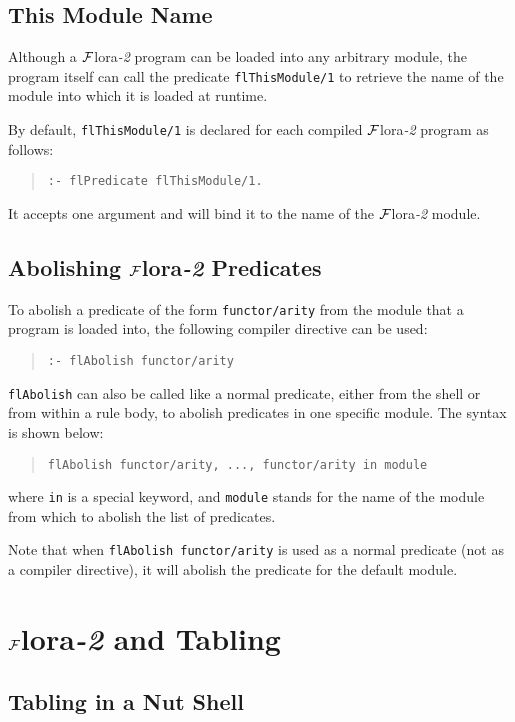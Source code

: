 \documentclass[11pt]{article}
\newcommand{\FLORA}{{\mbox{${\cal F}${\sc lora}\rm\emph{-2}}}\xspace}
\begin{document}
\subsection{This Module Name}


%
Although a \FLORA program can be loaded into any arbitrary module, the
program itself can call the predicate {\tt flThisModule/1} to retrieve
the name of the module into which it is loaded at runtime.

By default, {\tt flThisModule/1} is declared for each compiled \FLORA program
as follows:
\begin{quote}
\verb|:- flPredicate flThisModule/1.|
\end{quote}
It accepts one argument and will bind it to the name of the \FLORA
module.


\subsection{Abolishing \FLORA Predicates}


%
To abolish a predicate of the form {\tt functor/arity} from the module that
a program is loaded into, the following compiler directive can be used:
\begin{quote}
\verb!:- flAbolish functor/arity!
\end{quote}

{\tt flAbolish} can also be called like a normal predicate,
either from the shell or from within a rule body, to abolish
predicates in one specific module. The syntax is shown below:
\begin{quote}
\verb!flAbolish functor/arity, ..., functor/arity in module!
\end{quote}
where {\tt in} is a special keyword, and {\tt module} stands for the
name of the module from which to abolish the list of predicates.

Note that when {\tt flAbolish functor/arity} is used as a normal predicate
(not as a compiler directive), it will abolish the predicate for the
default module.


\section{\FLORA and Tabling}\label{sec-tabling-flora}


\subsection{Tabling in a Nut Shell}
\end{document}
